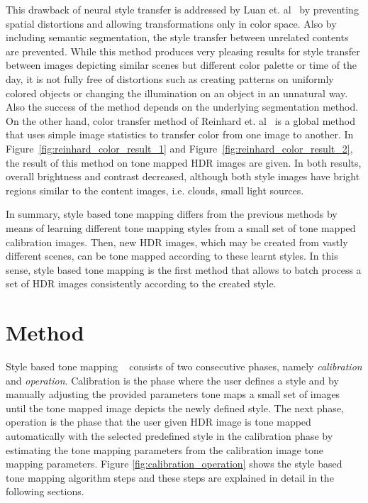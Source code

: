 This drawback of neural style transfer is addressed by Luan et. al~\cite{luan2017deep} by preventing spatial distortions and allowing transformations only in color space. Also by including semantic segmentation, the style transfer between unrelated contents are prevented. While this method produces very pleasing results for style transfer between images depicting similar scenes but different color palette or time of the day, it is not fully free of distortions such as creating patterns on uniformly colored objects or changing the illumination on an object in an unnatural way. Also the success of the method depends on the underlying segmentation method. On the other hand, color transfer method of Reinhard et. al~\cite{reinhard2001color} is a global method that uses simple image statistics to transfer color from one image to another. In Figure~\ref{fig:reinhard_color_result_1} and Figure~\ref{fig:reinhard_color_result_2}, the result of this method on tone mapped HDR images are given. In both results, overall brightness and contrast decreased, although both style images have bright regions similar to the content images, i.e. clouds, small light sources. 

In summary, style based tone mapping differs from the previous methods by means of learning different tone mapping styles from a small set of tone mapped calibration images. Then, new HDR images, which may be created from vastly different scenes, can be tone mapped according to these learnt styles. In this sense, style based tone mapping is the first method that allows to batch process a set of HDR images consistently according to the created style.

\section{Method}
Style based tone mapping ~\cite{akyuz2013style} consists of two consecutive phases, namely \emph{calibration} and \emph{operation}. Calibration is the phase where the user defines a style and by manually adjusting the provided parameters tone maps a small set of images until the tone mapped image depicts the newly defined style. The next phase, operation is the phase that the user given HDR image is tone mapped automatically with the selected predefined style in the calibration phase by estimating the tone mapping parameters from the calibration image tone mapping parameters. Figure \ref{fig:calibration_operation} shows the style based tone mapping algorithm steps and these steps are explained in detail in the following sections.

